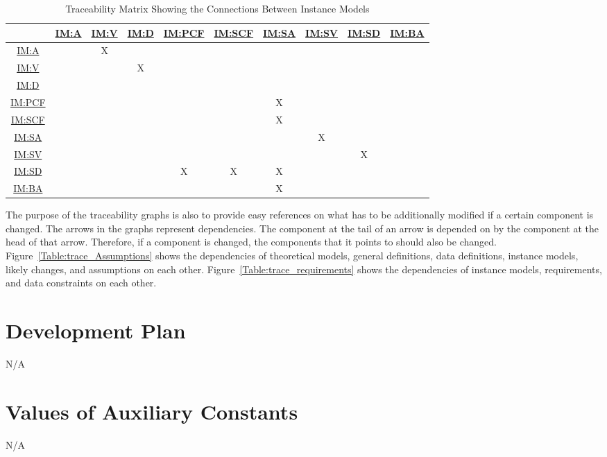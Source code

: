 \documentclass[12pt]{article}
\newcommand{\hpref}[1]{\hyperref[#1]{#1}}
\begin{document}
\begin{table}[h!]
\centering
\begin{tabular}{|c|c|c|c|c|c|c|c|c|c|}
\hline
	& \hpref{IM:A} & \hpref{IM:V}& \hpref{IM:D} & \hpref{IM:PCF} & \hpref{IM:SCF} & \hpref{IM:SA}& \hpref{IM:SV}& \hpref{IM:SD}& \hpref{IM:BA}\\
\hline
\hpref{IM:A}       & &X& & & & & & &  \\ \hline
\hpref{IM:V}       & & &X& & & & & &  \\ \hline
\hpref{IM:D}       & & & & & & & & &  \\ \hline
\hpref{IM:PCF}     & & & & & &X& & &  \\ \hline
\hpref{IM:SCF}     & & & & & &X& & &  \\ \hline
\hpref{IM:SA}      & & & & & & &X& &  \\ \hline
\hpref{IM:SV}      & & & & & & & &X&  \\ \hline
\hpref{IM:SD}      & & & &X&X&X& & & \\ \hline
\hpref{IM:BA}      & & & & & &X& & & \\ \hline
\end{tabular}
\caption{Traceability Matrix Showing the Connections Between Instance Models}
\label{Table:trace_IM}
\end{table}


The purpose of the traceability graphs is also to provide easy references on
what has to be additionally modified if a certain component is changed.  The
arrows in the graphs represent dependencies. The component at the tail of an
arrow is depended on by the component at the head of that arrow. Therefore, if a
component is changed, the components that it points to should also be
changed. Figure~\ref{Table:trace_Assumptions} shows the dependencies of theoretical models,
general definitions, data definitions, instance models, likely changes, and
assumptions on each other. Figure~\ref{Table:trace_requirements} shows the dependencies of
instance models, requirements, and data constraints on each other.

\section{Development Plan}

N/A

\section{Values of Auxiliary Constants}
N/A
\end{document}
